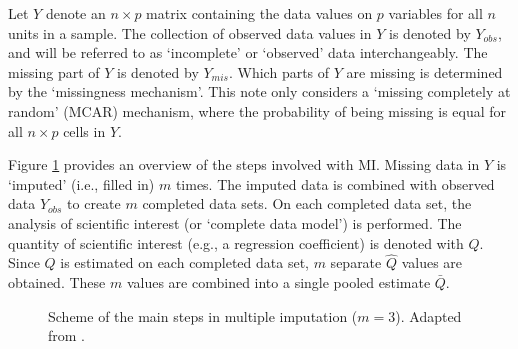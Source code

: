 \documentclass[article]{jss}
\begin{document}
Let $Y$ denote an $n \times p$ matrix containing the data values on $p$ variables for all $n$ units in a sample. The collection of observed data values in $Y$ is denoted by $Y_{obs}$, and will be referred to as `incomplete' or `observed' data interchangeably. The missing part of $Y$ is denoted by $Y_{mis}$. Which parts of $Y$ are missing is determined by the `missingness mechanism'. %
This note only considers a `missing completely at random' (MCAR) mechanism, where the probability of being missing is equal for all $n \times p$ cells in $Y$.


Figure \ref{fig:steps} provides an overview of the steps involved with MI. Missing data in $Y$ is `imputed' (i.e., filled in) $m$ times. The imputed data is combined with observed data $Y_{obs}$ to create $m$ completed data sets. On each completed data set, the analysis of scientific interest (or `complete data model') is performed. The quantity of scientific interest (e.g., a regression coefficient) is denoted with $Q$. Since $Q$ is estimated on each completed data set, $m$ separate $\hat{Q}$ values are obtained. These $m$ values are combined into a single pooled estimate $\bar{Q}$.


\begin{figure}
\label{fig:steps}
\centering
	\large{}
\caption{Scheme of the main steps in multiple imputation ($m = 3$). Adapted from \cite[\S~1.4.1]{buur18}.}
\end{figure}
\end{document}
